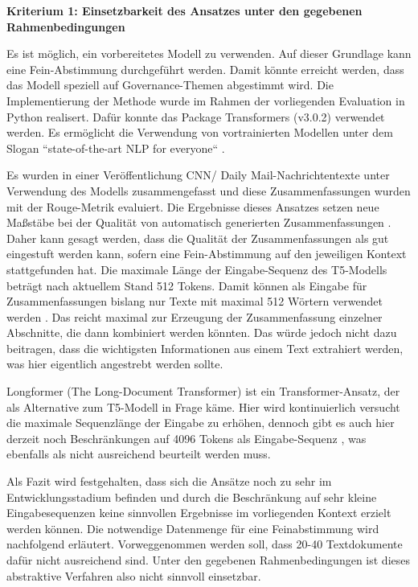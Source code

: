 {\bf Kriterium 1: Einsetzbarkeit des Ansatzes unter den gegebenen Rahmenbedingungen}

Es ist möglich, ein vorbereitetes Modell  zu verwenden. Auf dieser Grundlage kann eine Fein-Abstimmung durchgeführt werden. Damit könnte erreicht werden, dass das Modell speziell auf Governance-Themen abgestimmt wird. Die Implementierung der Methode wurde im Rahmen der vorliegenden Evaluation in Python realisert. Dafür konnte das Package Transformers (v3.0.2) verwendet werden. Es ermöglicht die Verwendung von vortrainierten Modellen unter dem Slogan ``state-of-the-art NLP for everyone`` \cite{Transformers}.

Es wurden in einer Veröffentlichung CNN/ Daily Mail-Nachrichtentexte unter Verwendung des Modells zusammengefasst und diese Zusammenfassungen wurden mit der Rouge-Metrik evaluiert. Die Ergebnisse dieses Ansatzes setzen neue Maßstäbe bei der Qualität von automatisch generierten Zusammenfassungen \cite[S. 39]{Raffel}. Daher kann gesagt werden, dass die Qualität der Zusammenfassungen als gut eingestuft werden kann, sofern eine Fein-Abstimmung auf den jeweiligen Kontext stattgefunden hat. Die maximale Länge der Eingabe-Sequenz des T5-Modells beträgt nach aktuellem Stand 512 Tokens. Damit können als Eingabe für Zusammenfassungen bislang nur Texte mit maximal 512 Wörtern verwendet werden \cite[S. 39]{Raffel}. Das reicht maximal zur Erzeugung der Zusammenfassung einzelner Abschnitte, die dann kombiniert werden könnten. Das würde jedoch nicht dazu beitragen, dass die wichtigsten Informationen aus einem Text extrahiert werden, was hier eigentlich angestrebt werden sollte.

Longformer (The Long-Document Transformer) ist ein Transformer-Ansatz, der als Alternative zum T5-Modell in Frage käme. Hier wird kontinuierlich versucht die maximale Sequenzlänge der Eingabe zu erhöhen, dennoch gibt es auch hier derzeit noch Beschränkungen auf 4096 Tokens als Eingabe-Sequenz \cite{Longformer} \cite{Longformer2}, was ebenfalls als nicht ausreichend beurteilt werden muss.

Als Fazit wird festgehalten, dass sich die Ansätze noch zu sehr im Entwicklungsstadium befinden und durch die Beschränkung auf sehr kleine Eingabesequenzen keine sinnvollen Ergebnisse im vorliegenden Kontext erzielt werden können. Die notwendige Datenmenge für eine Feinabstimmung wird nachfolgend erläutert. Vorweggenommen werden soll, dass 20-40 Textdokumente dafür nicht ausreichend sind. Unter den gegebenen Rahmenbedingungen ist dieses abstraktive Verfahren also nicht sinnvoll einsetzbar.

